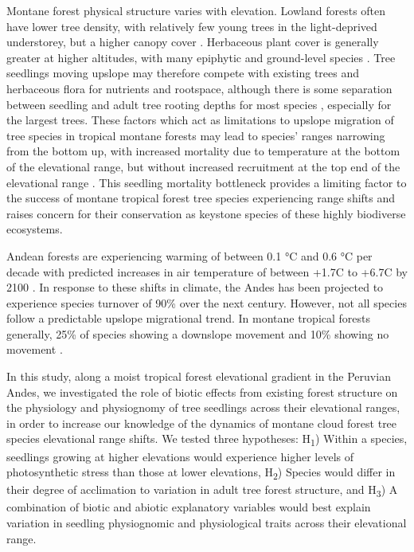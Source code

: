 \documentclass[a4paper, 11pt]{article}
\newcommand{\textapprox}{\raisebox{0.5ex}{\texttildelow}}
\begin{document}
Montane forest physical structure varies with elevation. Lowland forests often have lower tree density, with relatively few young trees in the light-deprived understorey, but a higher canopy cover \citep{}. Herbaceous plant cover is generally greater at higher altitudes, with many epiphytic and ground-level species \citep{Martin2010}. Tree seedlings moving upslope may therefore compete with existing trees and herbaceous flora for nutrients and rootspace, although there is some separation between seedling and adult tree rooting depths for most species \citep{Lewis2000}, especially for the largest trees. These factors which act as limitations to upslope migration of tree species in tropical montane forests may lead to species' ranges narrowing from the bottom up, with increased mortality due to temperature at the bottom of the elevational range, but without increased recruitment at the top end of the elevational range \citep{}. This seedling mortality bottleneck provides a limiting factor to the success of montane tropical forest tree species experiencing range shifts and raises concern for their conservation as keystone species of these highly biodiverse ecosystems.

Andean forests are experiencing warming of between 0.1 °C and 0.6 °C per decade \citep{Marengo2011, Vuille2015} with predicted increases in air temperature of between +1.7\textdegree{}C to +6.7\textdegree{}C by 2100 \citep{Magrin2014}. In response to these shifts in climate, the Andes has been projected to experience species turnover of 90\% over the next century. However, not all species follow a predictable upslope migrational trend. In montane tropical forests generally, \textapprox{}25\% of species showing a downslope movement and \textapprox{}10\% showing no movement \citep{Lenoir2010}.

In this study, along a moist tropical forest elevational gradient in the Peruvian Andes, we investigated the role of biotic effects from existing forest structure on the physiology and physiognomy of tree seedlings across their elevational ranges, in order to increase our knowledge of the dynamics of montane cloud forest tree species elevational range shifts. We tested three hypotheses: H\textsubscript{1}) Within a species, seedlings growing at higher elevations would experience higher levels of photosynthetic stress than those at lower elevations, H\textsubscript{2}) Species would differ in their degree of acclimation to variation in adult tree forest structure, and H\textsubscript{3}) A combination of biotic and abiotic explanatory variables would best explain variation in seedling physiognomic and physiological traits across their elevational range.
\end{document}
